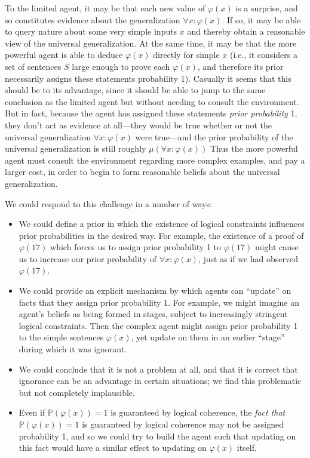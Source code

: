 \documentclass[12pt]{article}
\theoremstyle{definition}
\newcommand{\of}[1]{\left(#1\right)}
\renewcommand{\P}[1]{\mathbb{P}\of{#1}}
\newcommand{\vp}{\varphi}
\begin{document}
To the limited agent, it may be that each new value of $\vp\of{x}$ is a surprise,
and so constitutes evidence about the generalization $\forall x : \vp\of{x}$.
If so, it may be able to query nature about some very simple inputs $x$
and thereby obtain a reasonable view of the universal generalization.
At the same time, it may be that the more powerful agent is able to deduce $\vp\of{x}$
directly for simple $x$ (i.e., it considers a set of sentences $S$ large enough
to prove each $\vp\of{x}$, and therefore its prior necessarily
assigns these statements probability 1).
Casually it seems that this should be to its advantage, since it should be able
to jump to the same conclusion as the limited agent
but without needing to consult the environment.
But in fact, because the agent has assigned these statements \emph{prior probability}
1, they don't act as evidence at all---they would be true
whether or not the universal generalization $\forall x : \vp\of{x}$ were true---and
the prior probability of the universal generalization
is still roughly $\mu\of{\forall x : \vp\of{x}}$
Thus the more powerful agent must consult the environment regarding
more complex examples, and pay a larger cost,
in order to begin to form reasonable beliefs about the universal generalization.

We could respond to this challenge in a number of ways:
\begin{itemize}
\item We could define a prior in which the existence of logical constraints
influences prior probabilities in the desired way.
For example, the existence of a proof of $\vp\of{17}$ which forces
us to assign prior probability 1 to $\vp\of{17}$ might cause us to
increase our prior probability of $\forall x : \vp\of{x}$,
just as if we had observed $\vp\of{17}$.
\item We could provide an explicit mechanism
by which agents can ``update'' on facts that they assign prior probability 1.
For example, we might imagine an agent's beliefs as being formed in stages,
subject to increasingly stringent logical constraints.
Then the complex agent might assign prior probability 1 to the simple sentences $\vp\of{x}$,
yet update on them in an earlier ``stage'' during which it was ignorant.
\item We could conclude that it is not a problem at all, and that it is correct that ignorance
can be an advantage in certain situations; we find this problematic
but not completely implausible.
\item Even if $\P{\vp\of{x}} = 1$ is guaranteed by logical coherence,
the \emph{fact that} $\P{\vp\of{x}} = 1$ is guaranteed by logical coherence
may not be assigned probability 1, and so we could try to build the agent
such that updating on this fact would have a similar effect to updating
on $\vp\of{x}$ itself.
\end{itemize}
\end{document}
